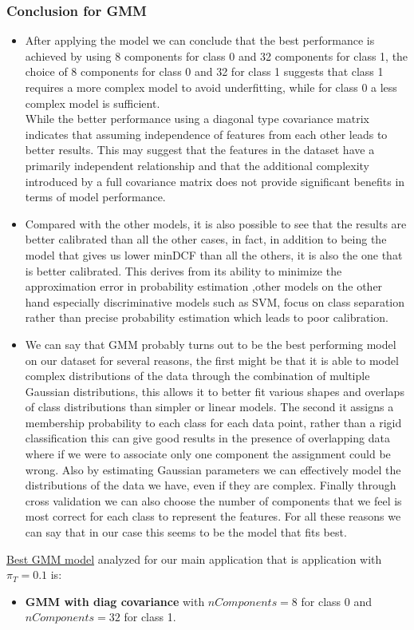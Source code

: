 \documentclass{article}
\begin{document}
\subsubsection*{Conclusion for GMM}
\begin{itemize}
    \item  After applying the model we can conclude that the best performance is achieved by using 8 components for class 0 and 32 components for class 1, the choice of 8 components for class 0 and 32 for class 1 suggests that class 1 requires a more complex model to avoid underfitting, while for class 0 a less complex model is sufficient.\\
    While the better performance using a diagonal type covariance matrix indicates that assuming independence of features from each other leads to better results. This may suggest that the features in the dataset have a primarily independent relationship and that the additional complexity introduced by a full covariance matrix does not provide significant benefits in terms of model performance.
    \item Compared with the other models, it is also possible to see that the results are better calibrated than all the other cases, in fact, in addition to being the model that gives us lower minDCF than all the others, it is also the one that is better calibrated. This derives from its ability to minimize the approximation error in probability estimation ,other models on the other hand especially discriminative models such as SVM, focus on class separation rather than precise probability estimation which leads to poor calibration.
    \item We can say that GMM probably turns out to be the best performing model on our dataset for several reasons, the first might be that it is able to model complex distributions of the data through the combination of multiple Gaussian distributions, this allows it to better fit various shapes and overlaps of class distributions than simpler or linear models. The second it assigns a membership probability to each class for each data point, rather than a rigid classification this can give good results in the presence of overlapping data where if we were to associate only one component the assignment could be wrong. Also by estimating Gaussian parameters we can effectively model the distributions of the data we have, even if they are complex. Finally through cross validation we can also choose the number of components that we feel is most correct for each class to represent the features. For all these reasons we can say that in our case this seems to be the model that fits best.

\end{itemize}
\underline{Best GMM model} analyzed for our main application that is application with \(\pi_T=0.1\) is:
\begin{itemize}
    \item \textbf{GMM with diag covariance} with \(nComponents=8\) for class 0 and \(nComponents=32\) for class 1.
\end{itemize}
\end{document}
